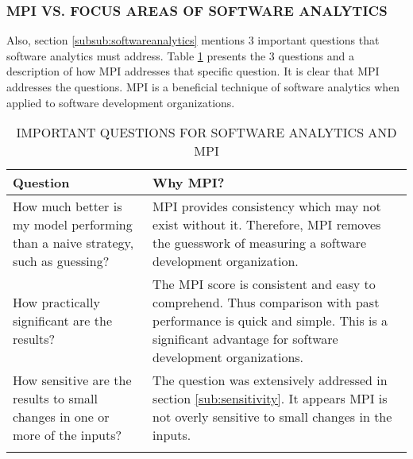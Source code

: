 \documentclass[SDSUThesis.tex]{subfiles}
\begin{document}
        
        \subsubsection{MPI VS. FOCUS AREAS OF SOFTWARE ANALYTICS}
            Also, section \ref{subsub:softwareanalytics} mentions 3 important questions that
            software analytics must address.  Table \ref{tab:questions} presents the 3 questions
            and a description of how MPI addresses that specific question.  It is clear
            that MPI addresses the questions.  MPI is a beneficial technique of software
            analytics when applied to software development organizations.
        
            \begin{longtable}{p{4cm}p{10cm}}
                
                \toprule%
                 \centering%
                 {\bfseries Question}
                 & {\bfseries Why MPI?} \\
                
                \cmidrule[0.4pt](r{0.125em}){1-1}%
                \cmidrule[0.4pt](lr{0.125em}){2-2}%
                \endhead
                
                How much better is my model performing than a naive strategy, such as guessing? & MPI 
                provides consistency which may not exist without it.  Therefore, MPI removes the 
                guesswork of measuring a software development organization. \\
                \myrowcolour%
                How practically significant are the results? & The MPI score is consistent
                and easy to comprehend.  Thus comparison with past performance is quick 
                and simple.  This is a significant advantage for software 
                development organizations. \\
                How sensitive are the results to small changes in one or more of the inputs? & 
                The question was extensively addressed in section \ref{sub:sensitivity}.  It appears MPI is
                not overly sensitive to small changes in the inputs.\\
                
                \bottomrule
                
                \caption{IMPORTANT QUESTIONS FOR SOFTWARE ANALYTICS AND MPI}
                \label{tab:questions}
            \end{longtable}
\end{document}
